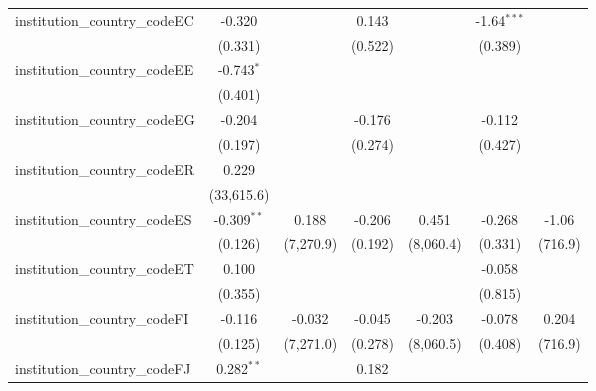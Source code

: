 \begin{tabular}{lcccccc}
   institution\_country\_codeEC          & -0.320         &               & 0.143          &                & -1.64$^{***}$  &   \\   
                                         & (0.331)        &               & (0.522)        &                & (0.389)        &   \\   
   institution\_country\_codeEE          & -0.743$^{*}$   &               &                &                &                &   \\   
                                         & (0.401)        &               &                &                &                &   \\   
   institution\_country\_codeEG          & -0.204         &               & -0.176         &                & -0.112         &   \\   
                                         & (0.197)        &               & (0.274)        &                & (0.427)        &   \\   
   institution\_country\_codeER          & 0.229          &               &                &                &                &   \\   
                                         & (33,615.6)     &               &                &                &                &   \\   
   institution\_country\_codeES          & -0.309$^{**}$  & 0.188         & -0.206         & 0.451          & -0.268         & -1.06\\   
                                         & (0.126)        & (7,270.9)     & (0.192)        & (8,060.4)      & (0.331)        & (716.9)\\   
   institution\_country\_codeET          & 0.100          &               &                &                & -0.058         &   \\   
                                         & (0.355)        &               &                &                & (0.815)        &   \\   
   institution\_country\_codeFI          & -0.116         & -0.032        & -0.045         & -0.203         & -0.078         & 0.204\\   
                                         & (0.125)        & (7,271.0)     & (0.278)        & (8,060.5)      & (0.408)        & (716.9)\\   
   institution\_country\_codeFJ          & 0.282$^{**}$   &               & 0.182          &                &                &   \\   

\end{tabular}
